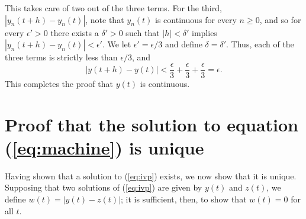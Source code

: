 \documentclass{myart}
\newcommand{\eq}[1]{(\ref{eq:#1})}
\begin{document}
This takes care of two out of the three terms. For the third, $|y_n(t + h) - y_n(t)|$, note that $y_n(t)$ is continuous for every $n \geq 0$, and so for every $\epsilon' > 0$ there exists a $\delta' > 0$ such that $|h| < \delta'$ implies $|y_n(t + h) - y_n(t)| < \epsilon'$. We let $\epsilon' = \epsilon/3$ and define $\delta = \delta'$. Thus, each of the three terms is strictly less than $\epsilon/3$, and
\begin{equation*}
|y(t + h) - y(t)| < \frac{\epsilon}{3} + \frac{\epsilon}{3} + \frac{\epsilon}{3} = \epsilon.
\end{equation*}
This completes the proof that $y(t)$ is continuous.

\section{Proof that the solution to equation \eq{machine} is unique}

Having shown that a solution to \eq{ivp} exists, we now show that it is unique. Supposing that two solutions of \eq{ivp} are given by $y(t)$ and $z(t)$, we define $w(t) = |y(t) - z(t)|$; it is sufficient, then, to show that $w(t) = 0$ for all $t$.
\end{document}
